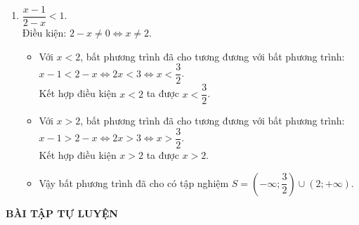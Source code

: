 \begin{vd}
{\begin{enumerate}
			Kết hợp điều kiện $x > -\dfrac{1}{2}$ ta được: $-\dfrac{1}{2} < x < \dfrac{5}{7}$.\\
			Vậy bất phương trình đã cho có tập nghiệm $S = \left(-\dfrac{1}{2}; \dfrac{5}{7} \right)$.
			\item $\dfrac{x-1}{2-x} < 1$.\\
			Điều kiện: $2-x \neq 0 \Leftrightarrow x \neq 2$.
			\begin{itemize}
				\item Với $x< 2$, bất phương trình đã cho tương đương với bất phương trình:\\
				$x-1 < 2-x \Leftrightarrow 2x < 3 \Leftrightarrow x < \dfrac{3}{2}$.\\
				Kết hợp điều kiện $x < 2$ ta được $x < \dfrac{3}{2}$.
				\item Với $x> 2$, bất phương trình đã cho tương đương với bất phương trình:\\
				$x-1 > 2-x \Leftrightarrow 2x > 3 \Leftrightarrow x > \dfrac{3}{2}$.\\
				Kết hợp điều kiện $x > 2$ ta được $x > 2$.
				\item Vậy bất phương trình đã cho có tập nghiệm $S = \left(-\infty; \dfrac{3}{2}\right) \cup \left(2; +\infty\right)$.
			\end{itemize}
		\end{enumerate}
	}
\end{vd}

\begin{center}
	\textbf{BÀI TẬP TỰ LUYỆN}
\end{center}

